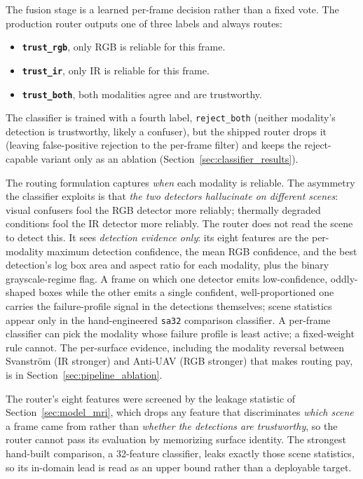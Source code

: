 The fusion stage is a learned per-frame decision rather than a fixed vote. The production router outputs one of three labels and always routes:

\begin{itemize}
    \item \textbf{\texttt{trust\_rgb}}, only RGB is reliable for this frame.
    \item \textbf{\texttt{trust\_ir}}, only IR is reliable for this frame.
    \item \textbf{\texttt{trust\_both}}, both modalities agree and are trustworthy.
\end{itemize}

The classifier is trained with a fourth label, \texttt{reject\_both} (neither modality's detection is trustworthy, likely a confuser), but the shipped router drops it (leaving false-positive rejection to the per-frame filter) and keeps the reject-capable variant only as an ablation (Section~\ref{sec:classifier_results}).

The routing formulation captures \emph{when} each modality is reliable. The asymmetry the classifier exploits is that \emph{the two detectors hallucinate on different scenes}: visual confusers fool the RGB detector more reliably; thermally degraded conditions fool the IR detector more reliably. The router does not read the scene to detect this. It sees \emph{detection evidence only}: its eight features are the per-modality maximum detection confidence, the mean RGB confidence, and the best detection's log box area and aspect ratio for each modality, plus the binary grayscale-regime flag. A frame on which one detector emits low-confidence, oddly-shaped boxes while the other emits a single confident, well-proportioned one carries the failure-profile signal in the detections themselves; scene statistics appear only in the hand-engineered \texttt{sa32} comparison classifier. A per-frame classifier can pick the modality whose failure profile is least active; a fixed-weight rule cannot. The per-surface evidence, including the modality reversal between Svanstr\"om (IR stronger) and Anti-UAV (RGB stronger) that makes routing pay, is in Section~\ref{sec:pipeline_ablation}.

The router's eight features were screened by the leakage statistic of Section~\ref{sec:model_mri}, which drops any feature that discriminates \emph{which scene} a frame came from rather than \emph{whether the detections are trustworthy}, so the router cannot pass its evaluation by memorizing surface identity. The strongest hand-built comparison, a 32-feature classifier, leaks exactly those scene statistics, so its in-domain lead is read as an upper bound rather than a deployable target.

